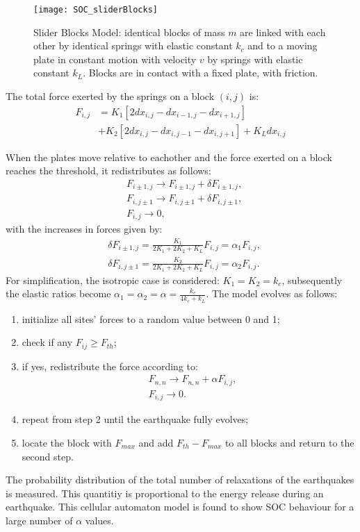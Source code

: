 \begin{figure}[!h]
  \centering
  \texttt{[image: SOC\_sliderBlocks]}
  \caption{Slider Blocks Model: identical blocks of mass $m$ are linked with each other by identical springs with elastic constant $k_c$ and to a moving plate in constant motion with velocity $v$ by springs with elastic constant $k_L$. Blocks are in contact with a fixed plate, with friction.}
  \label{fig:sliderBlock}
\end{figure}

The total force exerted by the springs on a block $(i,j)$ is:
\begin{align}
F_{i,j} &= K_1[2dx_{i,j}-dx_{i-1,j}-dx_{i+1,j}]\\
&+K_2[2dx_{i,j}-dx_{i,j-1}-dx_{i,j+1}]+K_Ldx_{i,j}
\end{align}

When the plates move relative to eachother and the force exerted on a block reaches the threshold, it redistributes as follows:
\begin{align}
&F_{i \pm 1,j} \to F_{i \pm 1,j} + \delta F_{i \pm 1,j},\\
&F_{i,j \pm 1} \to F_{i,j \pm 1} + \delta F_{i,j \pm 1},\\
&F_{i,j} \to 0,
\end{align}
with the increases in forces given by:
\begin{align}
& \delta F_{i \pm 1,j} = \frac{K_1}{2K_1+2K_2+K_L}F_{i,j} = \alpha_1 F_{i,j}, \\
& \delta F_{i,j \pm 1} = \frac{K_2}{2K_1+2K_2+K_L}F_{i,j} = \alpha_2 F_{i,j}.
\end{align}
For simplification, the isotropic case is considered: $K_1 = K_2 = k_c$, subsequently the elastic ratios become $\alpha_1 = \alpha_2 = \alpha = \frac{k_c}{4k_c+k_L}$.
The model evolves as follows:
\begin{enumerate}
	\item initialize all sites' forces to a random value between 0 and 1;
	\item check if any $F_{ij} \geq F_{th}$;
	\item if yes, redistribute the force according to:
	\begin{align}
	&F_{n,n} \to F_{n,n} + \alpha F_{i,j},\\
	&F_{i,j} \to 0.
	\end{align}
	\item repeat from step 2 until the earthquake fully evolves;
	\item locate the block with $F_{max}$ and add $F_{th}-F_{max}$ to all blocks and return to the second step.
\end{enumerate}
The probability distribution of the total number of relaxations of the earthquakes is measured. This quantitiy is proportional to the energy release during an earthquake. This cellular automaton model is found to show SOC behaviour for a large number of $\alpha$ values.\par 






